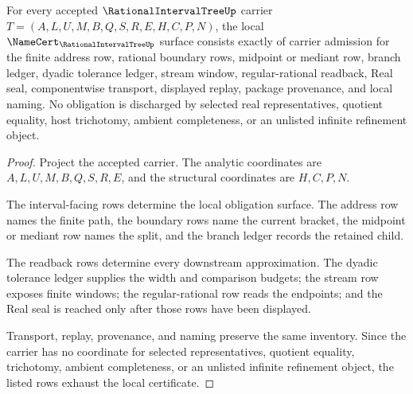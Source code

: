 \begin{theorem}
\label{thm:rational-interval-tree-namecert-obligations}
For every accepted $\RationalIntervalTreeUp$ carrier $T=(A,L,U,M,B,Q,S,R,E,H,C,P,N)$, the local $\NameCert_{\RationalIntervalTreeUp}$ surface consists exactly of carrier admission for the finite address row, rational boundary rows, midpoint or mediant row, branch ledger, dyadic tolerance ledger, stream window, regular-rational readback, Real seal, componentwise transport, displayed replay, package provenance, and local naming. No obligation is discharged by selected real representatives, quotient equality, host trichotomy, ambient completeness, or an unlisted infinite refinement object.
\end{theorem}
\begin{proof}
Project the accepted carrier. The analytic coordinates are $A,L,U,M,B,Q,S,R,E$, and the structural coordinates are $H,C,P,N$.

The interval-facing rows determine the local obligation surface. The address row names the finite path, the boundary rows name the current bracket, the midpoint or mediant row names the split, and the branch ledger records the retained child.

The readback rows determine every downstream approximation. The dyadic tolerance ledger supplies the width and comparison budgets; the stream row exposes finite windows; the regular-rational row reads the endpoints; and the Real seal is reached only after those rows have been displayed.

Transport, replay, provenance, and naming preserve the same inventory. Since the carrier has no coordinate for selected representatives, quotient equality, trichotomy, ambient completeness, or an unlisted infinite refinement object, the listed rows exhaust the local certificate.
\end{proof}

